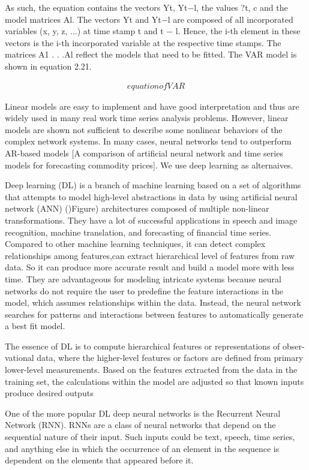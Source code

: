 \documentclass[5p]{elsarticle}
\begin{document}
As such, the equation contains the vectors Yt, Yt−l, the values ?t, c and the model matrices Al. The vectors Yt and Yt−l are composed of all incorporated variables (x, y, z, ...) at time stamp t and t − l. Hence, the i-th element in these vectors is the i-th incorporated variable at the respective time stamps. The matrices A1 . . .Al
reflect the models that need to be fitted. The VAR model is shown in equation 2.21.

\begin{align}
    equation of VAR
\end{align}

Linear models are easy to implement and have good interpretation and thus are widely used in many real work time series analysis problems. However, linear models are shown not sufficient to describe some nonlinear behaviors of the complex network systems. In many cases, neural networks tend to outperform AR-based models [A comparison of artificial neural network and time series models for forecasting commodity prices]. We use deep learning as alternaives.

Deep learning (DL) is a branch of machine learning based on a set of algorithms that attempts to model high-level abstractions in data by using artificial neural network (ANN) ()Figure) architectures composed of multiple non-linear transformations. They have a lot of successful applications in speech and image recognition, machine translation, and forecasting of financial time series. Compared to other machine learning techniques, it can detect complex relationships among features,can extract hierarchical level of features from raw data. So it can produce more accurate result and build a model more with less time. They are advantageous for modeling intricate systems because neural networks do not require the user to predefine the feature interactions in the model, which assumes relationships within the data. Instead, the neural network searches for patterns and interactions between features to automatically generate a best fit model.

The essence of DL is to compute hierarchical features or representations of obser-vational data, where the higher-level features or factors are defined from primary lower-level measurements. Based on the features extracted from the data in the training set, the calculations within the model are adjusted so that known inputs produce desired outputs

One of the more popular DL deep neural networks is the Recurrent Neural Network (RNN). RNNs are a class of neural networks that depend on the sequential nature of their input. Such inputs could be text, speech, time series, and anything else in which the occurrence of an element in the sequence is dependent on the elements that appeared before it.
\end{document}
